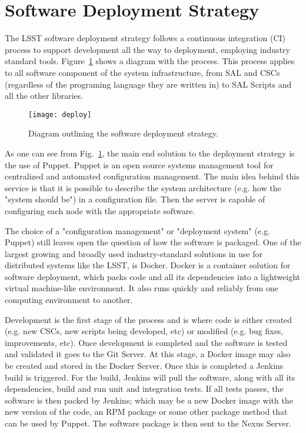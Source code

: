 \section{Software Deployment Strategy}\label{sect:deploy}
The LSST software deployment strategy follows a continuous integration (CI) process to support development all the way to 
deployment, employing industry standard tools. Figure~\ref{fig:deploy} shows a diagram with the process. This process 
applies to all software component of the system infrastructure, from SAL and CSCs (regardless of the 
programing language they are written in) to SAL Scripts and all the other libraries. 

\begin{figure}
\begin{center}
\texttt{[image: deploy]}
\caption{Diagram outlining the software deployment strategy.\label{fig:deploy}}
\end{center}
\end{figure}

As one can see from Fig.~\ref{fig:deploy}, the main end solution to the deployment strategy is the use of Puppet. Puppet is 
an open source systems management tool for centralized and automated configuration management. The main idea behind 
this service is that it is possible to describe the system architecture (e.g. how the "system should be") in a configuration
file. Then the server is capable of configuring each node with the appropriate software. 

The choice of a "configuration management" or "deployment system" (e.g. Puppet) still leaves open the question of how the 
software is packaged. One of the largest growing and broadly used industry-standard solutions in use for distributed systems 
like the LSST, is Docker. Docker is a container solution for software deployment, which packs code and all its 
dependencies into a lightweight virtual machine-like environment. It also runs quickly and reliably from one computing 
environment to another. 

Development is the first stage of the process and is where code is either created (e.g. new CSCs, new scripts being 
developed, etc) or modified (e.g. bug fixes, improvements, etc). Once development is completed and the software is tested 
and validated it goes to the Git Server. At this stage, a Docker image may also be created and stored in the Docker Server. 
Once this is completed a Jenkins build is triggered. For the build, Jenkins will pull the software, along with all its 
dependencies, build and run unit and integration tests. If all tests passes, the software is then packed by Jenkins; 
which may be a new Docker image with the new version of the code, an RPM package or some other package 
method that can be used by Puppet. The software package is then sent to the Nexus Server. 

